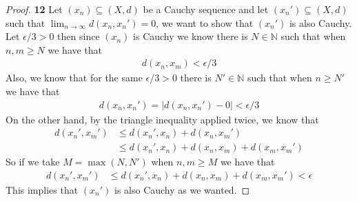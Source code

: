 \documentclass[11pt]{article}
\newcommand{\N}{\mathbb{N}}
\theoremstyle{definition}
\begin{document}
\cleardoublepage
\begin{proof}{\textbf{12}}
    Let $(x_n) \subseteq (X,d)$ be a Cauchy sequence and let
    $(x_n') \subseteq (X,d)$ such that $\lim_{n\to\infty} d(x_n, x_n') = 0$,
    we want to show that $(x_n')$ is also Cauchy.
    Let $\epsilon / 3 > 0$ then since $(x_n)$ is Cauchy we know there is
    $N \in \N$ such that when $n,m \geq N$ we have that
    \begin{align*}
        d(x_n, x_m) < \epsilon / 3
    \end{align*}
    Also, we know that for the same $\epsilon /3>0$ there is $N' \in \N$ such
    that when $n \geq N'$ we have that
    \begin{align*}
        d(x_n, x_n') = |d(x_n, x_n') - 0| < \epsilon / 3
    \end{align*}
    On the other hand, by the triangle inequality applied twice, we know that
    \begin{align*}
        d(x_n', x_m') &\leq d(x_n', x_n) + d(x_n, x_m')\\
            &\leq  d(x_n', x_n) + d(x_n, x_m) + d(x_m, x_m')
    \end{align*}
    So if we take $M = \max(N, N')$ when $n,m \geq M$ we have that
    \begin{align*}
        d(x_n', x_m') &\leq  d(x_n', x_n) + d(x_n, x_m) + d(x_m, x_m') < \epsilon
    \end{align*}
    This implies that $(x_n')$ is also Cauchy as we wanted.
\end{proof}
\end{document}
